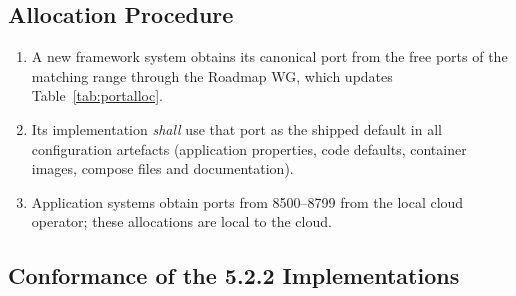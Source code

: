 \subsection{Allocation Procedure}
\begin{enumerate}
  \item A new framework system obtains its canonical port from the free ports of the matching
        range through the Roadmap WG, which updates Table~\ref{tab:portalloc}.
  \item Its implementation \emph{shall} use that port as the shipped default in all
        configuration artefacts (application properties, code defaults, container images,
        compose files and documentation).
  \item Application systems obtain ports from 8500--8799 from the local cloud operator; these
        allocations are local to the cloud.
\end{enumerate}

\subsection{Conformance of the 5.2.2 Implementations}

